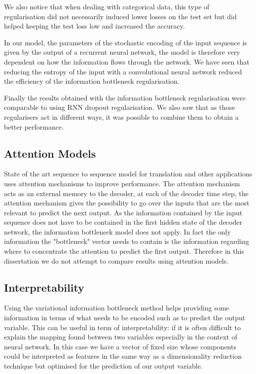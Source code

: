 \documentclass[11pt,oneside,openright]{report}
\begin{document}
We also notice that when dealing with categorical data, this type of regularisation did not necessarily induced lower losses on the test set but did helped keeping the test loss low and increased the accuracy.

In our model, the parameters of the stochastic encoding of the input sequence is given by the output of a recurrent neural network, the model is therefore very dependent on how the information flows through the network. We have seen that reducing the entropy of the input with a convolutional neural network reduced the efficiency of the information bottleneck regularisation.

Finally the results obtained with the information bottleneck regularisation were comparable to using RNN dropout regularisation. We also saw that as those regularisers act in different ways, it was possible to combine them to obtain a better performance.

\subsection{Attention Models}
State of the art sequence to sequence model for translation and other applications uses attention mechanisms to improve performance. The attention mechanism acts as an external memory to the decoder, at each of the decoder time step, the attention mechanism gives the possibility to go over the inputs that are the most relevant to predict the next output. As the information contained by the input sequence does not have to be contained in the first hidden state of the decoder network, the information bottleneck model does not apply. In fact the only information the "bottleneck" vector needs to contain is the information regarding where to concentrate the attention to predict the first output. Therefore in this dissertation we do not attempt to compare results using attention models.

\subsection{Interpretability}
Using the variational information bottleneck method helps providing some information in terms of what needs to be encoded such as to predict the output variable. This can be useful in term of interpretability: if it is often difficult to explain the mapping found between two variables especially in the context of neural network. In this case we have a vector of fixed size whose components could be interpreted as features in the same way as a dimensionality reduction technique but optimised for the prediction of our output variable.
\end{document}
